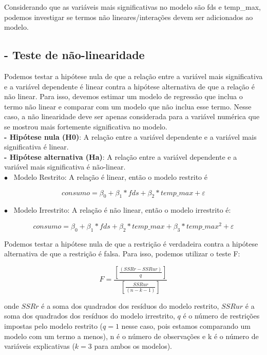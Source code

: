 \documentclass[a4paper, 12pt]{article}
\begin{document}
Considerando que as variáveis mais significativas no modelo são fds e temp\_max, podemos investigar se termos não lineares/interações devem ser adicionados ao modelo.

\subsection{- Teste de não-linearidade}

Podemos testar a hipótese nula de que a relação entre a variável mais significativa e a variável dependente é linear contra a hipótese alternativa de que a relação é não linear. Para isso, devemos estimar um modelo de regressão que inclua o termo não linear e comparar com um modelo que não inclua esse termo. Nesse caso, a não linearidade deve ser apenas considerada para a variável numérica que se mostrou mais fortemente significativa no modelo.\\

\textbf{- Hipótese nula (H0)}: A relação entre a variável dependente e a variável mais significativa é linear.\\
\textbf{- Hipótese alternativa (Ha)}:  A relação entre a variável dependente e a variável mais significativa é não-linear.\\

$\bullet$ \>\ Modelo Restrito: A relação é linear, então o modelo restrito é

\begin{equation}
    consumo = \beta_0 + \beta_1*fds + \beta_2*temp\_max + \varepsilon    
\end{equation}

$\bullet$ \>\ Modelo Irrestrito: A relação é não linear, então o modelo irrestrito é:

\begin{equation}
    consumo = \beta_0 + \beta_1*fds + \beta_2*temp\_max + \beta_3*temp\_max^2 + \varepsilon    
\end{equation}

Podemos testar a hipótese nula de que a restrição é verdadeira contra a hipótese alternativa de que a restrição é falsa. Para isso, podemos utilizar o teste F:

\begin{equation}
    F = \frac{[\frac{(SSRr - SSRur) }{q}]}{ [\frac{SSRur}{(n - k - 1)}]}
\end{equation}

onde $SSRr$ é a soma dos quadrados dos resíduos do modelo restrito, $SSRur$ é a soma dos quadrados dos resíduos do modelo irrestrito, $q$ é o número de restrições impostas pelo modelo restrito ($q = 1$ nesse caso, pois estamos comparando um modelo com um termo a menos), n é o número de observações e k é o número de variáveis explicativas ($k = 3$ para ambos os modelos).\\
\end{document}
